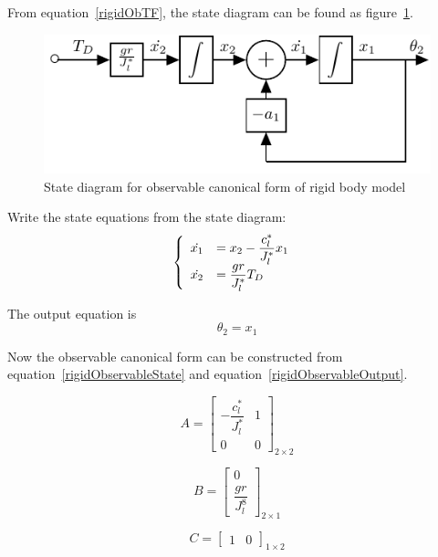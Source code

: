 \documentclass[a4paper, 12pt]{article}
\begin{document}
From equation~\ref{rigidObTF}, the state diagram can be found as figure~\ref{rigidObStateDiag}.
\begin{figure}[!htbp]
\centering
\includegraphics[scale = 1.5]{Observer4RigidBody}
\caption{State diagram for observable canonical form of rigid body model}
\label{rigidObStateDiag}
\end{figure}

Write the state equations from the state diagram:
\begin{equation}\label{rigidObservableState}
\left\{ \begin{array}{l l} 
\dot{x_1} &= x_2 - \dfrac{c_l^*}{J_l^*}x_1\\
\dot{x_2} &= \dfrac{gr}{J_l^*}T_D
\end{array}\right.\ 
\end{equation}

The output equation is 
\begin{equation}\label{rigidObservableOutput}
\theta_2 = x_1
\end{equation}

Now the observable canonical form can be constructed from equation~\ref{rigidObservableState} and equation~\ref{rigidObservableOutput}.

\begin{equation}\label{rigidObservableA}
A = \begin{bmatrix}
-\dfrac{c_l^*}{J_l^*}	&	1	\\
0	&	0
\end{bmatrix}_{2\times 2}
\end{equation}


\begin{equation}\label{rigidObservableB}
B = \begin{bmatrix}
0	\\
\dfrac{gr}{J_l^8}
\end{bmatrix}_{2\times 1}
\end{equation}


\begin{equation}\label{rigidControllableC}
C = \begin{bmatrix}
1	&	0
\end{bmatrix}_{1\times 2}
\end{equation}
\end{document}
